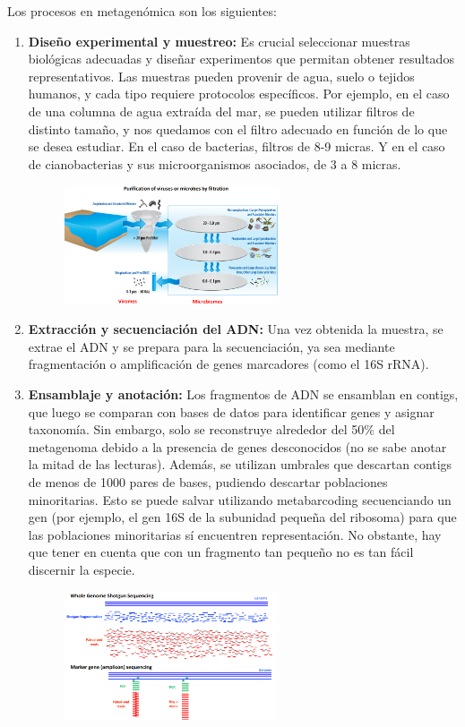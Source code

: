 Los procesos en metagenómica son los siguientes:
\begin{enumerate}
\item \textbf{Diseño experimental y muestreo:} Es crucial seleccionar muestras biológicas adecuadas y diseñar experimentos que permitan obtener resultados representativos. Las muestras pueden provenir de agua, suelo o tejidos humanos, y cada tipo requiere protocolos específicos. Por ejemplo, en el caso de una columna de agua extraída del mar, se pueden utilizar filtros de distinto tamaño, y nos quedamos con el filtro adecuado en función de lo que se desea estudiar. En el caso de bacterias, filtros de 8-9 micras. Y en el caso de cianobacterias y sus microorganismos asociados, de 3 a 8 micras.

\begin{figure}[h]
\centering
\includegraphics[width = 0.6\textwidth]{figs/filtros.png}
\end{figure}

\item \textbf{Extracción y secuenciación del ADN:} Una vez obtenida la muestra, se extrae el ADN y se prepara para la secuenciación, ya sea mediante fragmentación o amplificación de genes marcadores (como el 16S rRNA).
\item \textbf{Ensamblaje y anotación:} Los fragmentos de ADN se ensamblan en contigs, que luego se comparan con bases de datos para identificar genes y asignar taxonomía. Sin embargo, solo se reconstruye alrededor del 50\% del metagenoma debido a la presencia de genes desconocidos (no se sabe anotar la mitad de las lecturas). Además, se utilizan umbrales que descartan contigs de menos de 1000 pares de bases, pudiendo descartar poblaciones minoritarias. Esto se puede salvar utilizando metabarcoding secuenciando un gen (por ejemplo, el gen 16S de la subunidad pequeña del ribosoma) para que las poblaciones minoritarias sí encuentren representación. No obstante, hay que tener en cuenta que con un fragmento tan pequeño no es tan fácil discernir la especie.

\begin{figure}[h]
\centering
\includegraphics[width = 0.6\textwidth]{figs/assembly.png}
\end{figure}


\end{enumerate}
